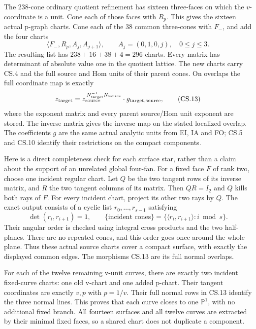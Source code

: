 The 238-cone ordinary quotient refinement has sixteen
three-faces on which the \(v\)-coordinate is a unit.
Cone each of those faces with \(R_p\). This gives the
sixteen actual p-graph charts. Cone each of the 38
common three-cones with \(F_-\), and add the four
charts
\[
 \langle F_-,R_p,A_j,A_{j+1}\rangle,\qquad
 A_j=(0,1,0,j),\quad 0\le j\le3.
 \tag{CS.12}
\]
The resulting list has \(238+16+38+4=296\) charts.
Every matrix has determinant of absolute value one in
the quotient lattice. The new charts carry CS.4 and
the full source and Hom units of their parent cones.
On overlaps the full coordinate map is exactly
\[
 z_{\rm target}
   =z_{\rm source}^{\,N_{\rm target}^{-1}N_{\rm source}}
       \cdot g_{\rm target,source},
 \tag{CS.13}
\]
where the exponent matrix and every parent source/Hom
unit exponent are stored. The inverse matrix gives
the inverse map on the stated localized overlap.
The coefficients \(g\) are the same actual analytic
units from EI, IA and FO; CS.5 and CS.10 identify
their restrictions on the compact components.

Here is a direct completeness check for each surface
star, rather than a claim about the support of an
unrelated global four-fan. For a fixed face \(F\) of
rank two, choose one incident regular chart. Let
\(Q\) be the two tangent rows of its inverse matrix,
and \(R\) the two tangent columns of its matrix.
Then \(QR=I_2\) and \(Q\) kills both rays of \(F\).
For every incident chart, project its other two rays
by \(Q\). The exact output consists of a cyclic
list \(r_0,\ldots,r_{s-1}\) satisfying
\[
 \det(r_i,r_{i+1})=1,
 \qquad
 \{\text{incident cones}\}
    =\{\langle r_i,r_{i+1}\rangle: i\bmod s\}.
 \tag{CS.14}
\]
Their angular order is checked using integral cross
products and the two half-planes. There are no repeated
cones, and this order goes once around the whole plane.
Thus these actual source charts cover a compact
surface, with exactly the displayed common edges.
The morphisms CS.13 are its full normal overlaps.

For each of the twelve remaining v-unit curves, there
are exactly two incident fixed-curve charts: one old
v-chart and one added p-chart. Their tangent
coordinates are exactly \(v,p\) with \(p=1/v\).
Their full normal rows in CS.13 identify the three
normal lines. This proves that each curve closes to
one \(\mathbb P^1\), with no additional fixed branch.
All fourteen surfaces and all twelve curves are
extracted by their minimal fixed faces, so a shared
chart does not duplicate a component.

